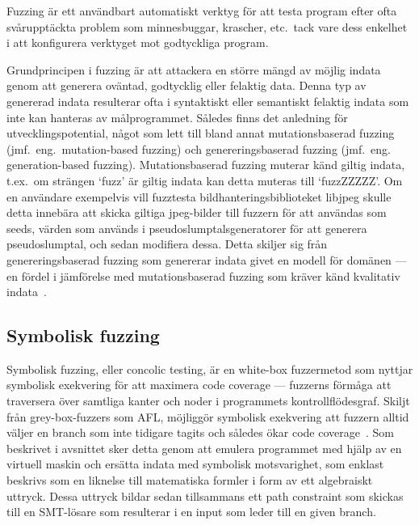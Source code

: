 Fuzzing är ett användbart automatiskt verktyg för att testa program efter ofta
svårupptäckta problem som minnesbuggar, krascher, etc.\ tack vare dess enkelhet i
att konfigurera verktyget mot godtyckliga program.

Grundprincipen i fuzzing är att attackera en större mängd av möjlig indata genom
att generera oväntad, godtycklig eller felaktig data. Denna typ av genererad
indata resulterar ofta i syntaktiskt eller semantiskt felaktig indata som inte
kan hanteras av målprogrammet. Således finns det anledning för
utvecklingspotential, något som lett till bland annat mutationsbaserad fuzzing
(jmf.\ eng.\ mutation-based fuzzing) och genereringsbaserad fuzzing (jmf.\ eng.
generation-based fuzzing). Mutationsbaserad fuzzing muterar känd giltig indata,
t.ex.\ om strängen `fuzz' är giltig indata kan detta muteras till `fuzzZZZZZ'. Om
en användare exempelvis vill fuzztesta bildhanteringsbiblioteket libjpeg skulle
detta innebära att skicka giltiga jpeg-bilder till fuzzern för att användas som
seeds, värden som används i pseudoslumptalsgeneratorer för att generera
pseudoslumptal, och sedan modifiera dessa. Detta skiljer sig från
genereringsbaserad fuzzing som genererar indata givet en modell för domänen ---
en fördel i jämförelse med mutationsbaserad fuzzing som kräver känd kvalitativ
indata~\cite{fuzzing}.

\subsection{Symbolisk fuzzing} Symbolisk fuzzing, eller concolic testing, är en
white-box fuzzermetod som nyttjar symbolisk exekvering för att maximera code
coverage --- fuzzerns förmåga att traversera över samtliga kanter och noder i
programmets kontrollflödesgraf. Skiljt från grey-box-fuzzers som AFL, möjliggör
symbolisk exekvering att fuzzern alltid väljer en branch som inte tidigare
tagits och således ökar code coverage~\cite{challenges_fuzzing}. Som beskrivet i
avsnittet  sker detta genom att emulera programmet
med hjälp av en virtuell maskin och ersätta indata med symbolisk motsvarighet,
som enklast beskrivs som en liknelse till matematiska formler i form av ett
algebraiskt uttryck. Dessa uttryck bildar sedan tillsammans ett path constraint
som skickas till en SMT-lösare som resulterar i en input som leder till en given
branch.

